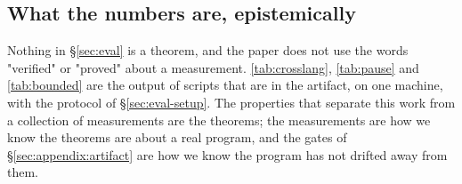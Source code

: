 \subsection{What the numbers are, epistemically}

Nothing in \S\ref{sec:eval} is a theorem, and the paper does not use the words "verified" or "proved"
about a measurement.  \tab\ref{tab:crosslang}, \tab\ref{tab:pause} and \tab\ref{tab:bounded} are the
output of scripts that are in the artifact, on one machine, with the protocol of
\S\ref{sec:eval-setup}.  The properties that separate this work from a collection of measurements are
the theorems; the measurements are how we know the theorems are about a real program, and the gates
of \S\ref{sec:appendix:artifact} are how we know the program has not drifted away from them.

